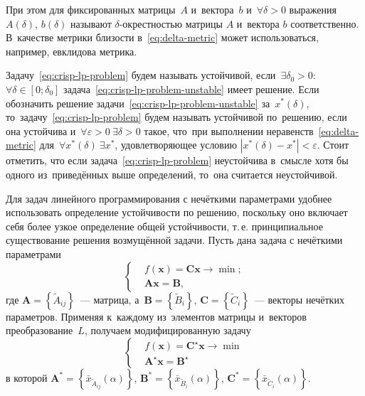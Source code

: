 При этом для фиксированных матрицы~$A$ и~вектора~$b$ и~$\forall \delta >\text{0}$ выражения $A\left(\delta \right)$, $b\left(\delta \right)$ называют $\delta$-окрестностью матрицы $A$ и~вектора $b$ соответственно. В~качестве метрики близости в~\eqref{eq:delta-metric} может использоваться, например, евклидова метрика.

Задачу~\eqref{eq:crisp-lp-problem} будем называть устойчивой, если~$\exists \delta_0 > 0$: $\forall \delta \in \left[ 0; \delta_0 \right]$  задача~\eqref{eq:crisp-lp-problem-unstable} имеет решение. Если обозначить решение задачи~\eqref{eq:crisp-lp-problem-unstable} за~$x^{*} \left(\delta \right)$, то~задачу~\eqref{eq:crisp-lp-problem} будем называть устойчивой по~решению, если она устойчива и~$\forall \varepsilon>0\ \exists \delta > 0$ такое, что~при выполнении неравенств~\eqref{eq:delta-metric} для~$\forall x^{*} \left(\delta \right)\ \exists x^{*}$, удовлетворяющее условию $\left| x^{*}\left(\delta \right)- x^{*} \right| < \varepsilon$. Стоит отметить, что если задача~\eqref{eq:crisp-lp-problem} неустойчива в~смысле хотя бы одного из~приведённых выше определений, то~она считается неустойчивой.

Для задач линейного программирования с нечёткими параметрами удобнее использовать определение устойчивости по решению, поскольку оно включает себя более узкое определение общей устойчивости, т.\,е. принципиальное существование решения возмущённой задачи. Пусть дана задача с нечёткими параметрами
\begin{equation*}
  \left\{ \begin{aligned}
    & f\left( \mathbf{x} \right)=\mathbf{Cx}\to \min;  \\ 
    & \mathbf{Ax}=\mathbf{B},
  \end{aligned} \right.
\end{equation*}
где $\mathbf{A}=\left\{ \tilde{A}_{ij} \right\}$~--- матрица, а~$\mathbf{B}=\left\{ \tilde{B}_i \right\}$, $\mathbf{C}=\left\{\tilde{C}_i \right\}$~--- векторы нечётких параметров. Применяя к~каждому из~элементов матрицы и~векторов преобразование~$L$, получаем модифицированную задачу
\begin{equation}
\label{eq:fuzzy-lp-unstable-problem}
  \left\{ \begin{aligned}
    & f\left( \mathbf{x} \right)={\mathbf{C}^{\star}}\mathbf{x}\to \min  \\ 
    & {\mathbf{A}^{\star}}\mathbf{x}={\mathbf{B}}^{\star}
  \end{aligned} \right.
\end{equation}
в которой $\mathbf{A}^{*}=\left\{ \bar{x}_{\tilde{A}_{ij}}\left(\alpha \right) \right\}$, $\mathbf{B}^{*}=\left\{ \bar{x}_{\tilde{B}_i}\left(\alpha \right) \right\}$, $\mathbf{C}^{*}=\left\{ \bar{x}_{\tilde{C}_i}\left(\alpha \right) \right\}$.

